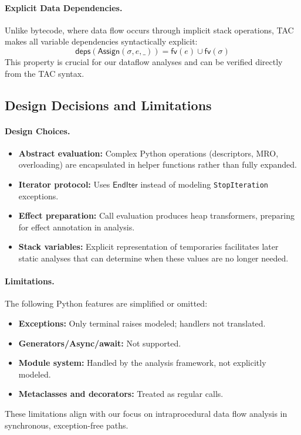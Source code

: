 \paragraph{Explicit Data Dependencies.}
Unlike bytecode, where data flow occurs through implicit stack operations, TAC makes all variable dependencies syntactically explicit:
\[
\mathsf{deps}(\mathsf{Assign}(\sigma, e, \_)) = \mathsf{fv}(e) \cup \mathsf{fv}(\sigma)
\]
This property is crucial for our dataflow analyses and can be verified directly from the TAC syntax.

\subsection{Design Decisions and Limitations}

\paragraph{Design Choices.}
\begin{itemize}
\item \textbf{Abstract evaluation:} Complex Python operations (descriptors, MRO, overloading) are encapsulated in helper functions rather than fully expanded.
\item \textbf{Iterator protocol:} Uses $\mathsf{EndIter}$ instead of modeling \texttt{StopIteration} exceptions.
\item \textbf{Effect preparation:} Call evaluation produces heap transformers, preparing for effect annotation in analysis.
\item \textbf{Stack variables:} Explicit representation of temporaries facilitates later static analyses that can determine when these values are no longer needed.
\end{itemize}

\paragraph{Limitations.}
The following Python features are simplified or omitted:
\begin{itemize}
\item \textbf{Exceptions:} Only terminal raises modeled; handlers not translated.
\item \textbf{Generators/Async/await:} Not supported.
\item \textbf{Module system:} Handled by the analysis framework, not explicitly modeled.
\item \textbf{Metaclasses and decorators:} Treated as regular calls.
\end{itemize}

These limitations align with our focus on intraprocedural data flow analysis in synchronous, exception-free paths.
